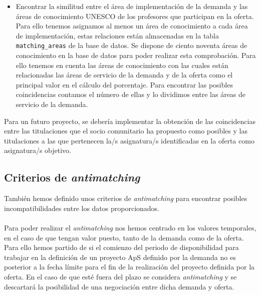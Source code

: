 \documentclass[11pt]{book}
\begin{document}
\begin{itemize}
		\item Encontrar la similitud entre el área de implementación de la demanda y las áreas de conocimiento UNESCO de los profesores que participan en la oferta. Para ello tenemos asignamos al menos un área de conocimiento a cada área de implementación, estas relaciones están almacenadas en la tabla \texttt{matching\_areas} de la base de datos. Se dispone de ciento noventa áreas de conocimiento en la base de datos para poder realizar esta comprobación. Para ello tenemos en cuenta las áreas de conocimiento con las cuales están relacionadas las áreas de servicio de la demanda y de la oferta como el principal valor en el cálculo del porcentaje. Para encontrar las posibles coincidencias contamos el número de ellas y lo dividimos entre las áreas de servicio de la demanda.
	\end{itemize}
	
	Para un futuro proyecto, se debería implementar la obtención de las coincidencias entre las
	titulaciones que el socio comunitario ha propuesto como posibles y las
	titulaciones a las que pertenecen la/s asignatura/s identificadas en la
	oferta como asignatura/s objetivo. 
	
	\subsection{Criterios de \textit{antimatching} }
	
	También hemos definido unos criterios de \emph{antimatching} para encontrar posibles incompatibilidades entre los datos proporcionados.\\\\
	Para poder realizar el \emph{antimatching} nos hemos centrado en los valores temporales, en el caso de que tengan valor puesto, tanto de la demanda como de la oferta. Para ello hemos partido de si el comienzo del periodo de disponibilidad para trabajar en la definición
	de un proyecto ApS definido por la demanda no es posterior a la fecha límite para el fin de la realización del proyecto definida por la oferta. En el caso de que esté fuera del plazo se considera \emph{antimatching} y se descartará la posibilidad de una negociación entre dicha demanda y oferta. \\\\
	
\end{document}
